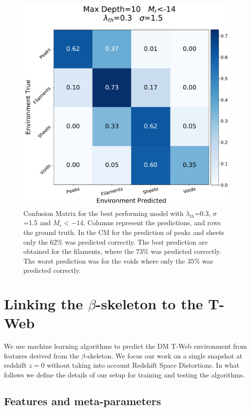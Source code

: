 \documentclass[usenatbib]{mnras}
\begin{document}
\begin{figure}
\centering
    \includegraphics[scale=0.36]{Figs/p_CM_EnvPredTreeClass.pdf}
    \caption{Confusion Matrix for the best performing model with $\lambda_{th}$=0.3, $\sigma$=1.5 and $M_{r}<-14$. Columns represent the predictions, and rows the ground truth. In the CM for the prediction of peaks and sheets only the $62\%$ was predicted correctly. The best prediction are obtained for the filaments, where the $73\%$ was predicted correctly. The worst prediction was for the voids where only the $35\%$ was predicted correctly.}
    \label{fig:confusion_matrix}    
\end{figure}


\section{Linking the $\beta$-skeleton to the T-Web}\label{sec:link}

We use machine learning algorithms to predict the DM T-Web environment from features derived
from the $\beta$-skeleton.
We focus our work on a single snapshot at redshift $z=0$ without taking into
account Redshift Space Distortions.
In what follows we define the details of our setup for training and testing the algorithms.


\subsection{Features and meta-parameters}
\end{document}
